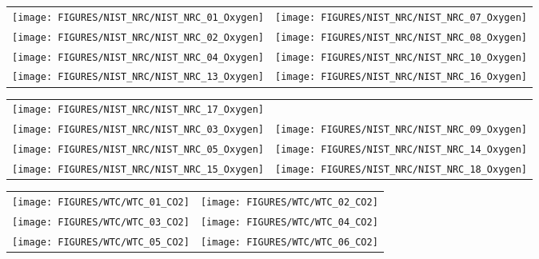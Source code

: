\begin{figure}[p]
\begin{tabular*}{\textwidth}{l@{\extracolsep{\fill}}r}
\texttt{[image: FIGURES/NIST\_NRC/NIST\_NRC\_01\_Oxygen]} &
\texttt{[image: FIGURES/NIST\_NRC/NIST\_NRC\_07\_Oxygen]} \\
\texttt{[image: FIGURES/NIST\_NRC/NIST\_NRC\_02\_Oxygen]} &
\texttt{[image: FIGURES/NIST\_NRC/NIST\_NRC\_08\_Oxygen]} \\
\texttt{[image: FIGURES/NIST\_NRC/NIST\_NRC\_04\_Oxygen]} &
\texttt{[image: FIGURES/NIST\_NRC/NIST\_NRC\_10\_Oxygen]} \\
\texttt{[image: FIGURES/NIST\_NRC/NIST\_NRC\_13\_Oxygen]} &
\texttt{[image: FIGURES/NIST\_NRC/NIST\_NRC\_16\_Oxygen]}
\end{tabular*}
\label{NIST_NRC_Gas_Closed}
\end{figure}

\begin{figure}[p]
\begin{tabular*}{\textwidth}{l@{\extracolsep{\fill}}r}
\texttt{[image: FIGURES/NIST\_NRC/NIST\_NRC\_17\_Oxygen]} &
 \\
\texttt{[image: FIGURES/NIST\_NRC/NIST\_NRC\_03\_Oxygen]} &
\texttt{[image: FIGURES/NIST\_NRC/NIST\_NRC\_09\_Oxygen]} \\
\texttt{[image: FIGURES/NIST\_NRC/NIST\_NRC\_05\_Oxygen]} &
\texttt{[image: FIGURES/NIST\_NRC/NIST\_NRC\_14\_Oxygen]} \\
\texttt{[image: FIGURES/NIST\_NRC/NIST\_NRC\_15\_Oxygen]} &
\texttt{[image: FIGURES/NIST\_NRC/NIST\_NRC\_18\_Oxygen]}
\end{tabular*}
\label{NIST_NRC_Gas_Open}
\end{figure}


\begin{figure}[p]
\begin{tabular*}{\textwidth}{l@{\extracolsep{\fill}}r}
\texttt{[image: FIGURES/WTC/WTC\_01\_CO2]} &
\texttt{[image: FIGURES/WTC/WTC\_02\_CO2]} \\
\texttt{[image: FIGURES/WTC/WTC\_03\_CO2]} &
\texttt{[image: FIGURES/WTC/WTC\_04\_CO2]} \\
\texttt{[image: FIGURES/WTC/WTC\_05\_CO2]} &
\texttt{[image: FIGURES/WTC/WTC\_06\_CO2]}
\end{tabular*}
\label{NIST_WTC_CO2}
\end{figure}


